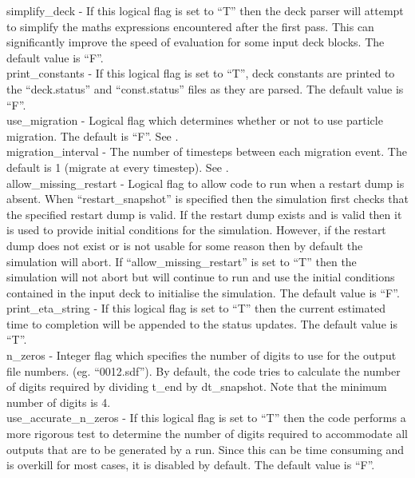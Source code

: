 {\emphtext simplify\_deck} - If this logical flag is set to ``T'' then the deck
  parser will attempt to simplify the maths expressions encountered after the
  first pass. This can significantly improve the speed of evaluation for some
  input deck blocks. The default value is ``F''.\\

{\emphtext print\_constants} - If this logical flag is set to ``T'', deck
  constants are printed to the ``deck.status'' and ``const.status'' files
  as they are parsed. The default value is ``F''.\\

{\emphtext use\_migration} - Logical flag which determines whether or not to
  use particle migration. The default is ``F''. See .\\

{\emphtext migration\_interval} - The number of timesteps between each
  migration event.  The default is 1 (migrate at every timestep).
  See .\\

{\emphtext allow\_missing\_restart} - Logical flag to allow code to run when
  a restart dump is absent.
  When ``restart\_snapshot'' is specified then the simulation first
  checks that the specified restart dump is valid. If the restart dump
  exists and is valid then it is used to provide initial conditions
  for the simulation.
  However, if the restart dump does not exist or is not usable for
  some reason then by default the simulation will abort.
  If ``allow\_missing\_restart'' is set to ``T'' then the simulation will
  not abort but will continue to run and use the initial conditions
  contained in the input deck to initialise the simulation.
  The default value is ``F''.\\

{\emphtext print\_eta\_string} - If this logical flag is set to ``T'' then the
  current estimated time to completion will be appended to the status
  updates. The default value is ``T''.\\

{\emphtext n\_zeros} - Integer flag which specifies the number of digits to
  use for the output file numbers.
  (eg. ``0012.sdf''). By default, the code tries to calculate the number of
  digits required by dividing t\_end by dt\_snapshot. Note that the minimum
  number of digits is 4.\\

{\emphtext use\_accurate\_n\_zeros} - If this logical flag is set to
  ``T'' then the code performs a more rigorous test to determine the number of
  digits required to accommodate all outputs that are to be generated by a run.
  Since this can be time consuming and is overkill for most cases, it is
  disabled by default.
  The default value is ``F''.\\

